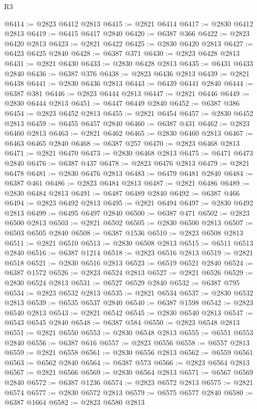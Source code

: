 \begin{lexlean}{R3}
\begin{coremodule}
@6414 := @2823 @6412 @2813
@6415 := @2821 @6414
@6417 := @2830 @6412 @2813
@6419 := @6415 @6417 @2840
@6420 := @6387 @366
@6422 := @2823 @6420 @2813
@6423 := @2821 @6422
@6425 := @2830 @6420 @2813
@6427 := @6423 @6425 @2840
@6428 := @6387 @371
@6430 := @2823 @6428 @2813
@6431 := @2821 @6430
@6433 := @2830 @6428 @2813
@6435 := @6431 @6433 @2840
@6436 := @6387 @376
@6438 := @2823 @6436 @2813
@6439 := @2821 @6438
@6441 := @2830 @6436 @2813
@6443 := @6439 @6441 @2840
@6444 := @6387 @381
@6446 := @2823 @6444 @2813
@6447 := @2821 @6446
@6449 := @2830 @6444 @2813
@6451 := @6447 @6449 @2840
@6452 := @6387 @386
@6454 := @2823 @6452 @2813
@6455 := @2821 @6454
@6457 := @2830 @6452 @2813
@6459 := @6455 @6457 @2840
@6460 := @6387 @431
@6462 := @2823 @6460 @2813
@6463 := @2821 @6462
@6465 := @2830 @6460 @2813
@6467 := @6463 @6465 @2840
@6468 := @6387 @257
@6470 := @2823 @6468 @2813
@6471 := @2821 @6470
@6473 := @2830 @6468 @2813
@6475 := @6471 @6473 @2840
@6476 := @6387 @437
@6478 := @2823 @6476 @2813
@6479 := @2821 @6478
@6481 := @2830 @6476 @2813
@6483 := @6479 @6481 @2840
@6484 := @6387 @461
@6486 := @2823 @6484 @2813
@6487 := @2821 @6486
@6489 := @2830 @6484 @2813
@6491 := @6487 @6489 @2840
@6492 := @6387 @466
@6494 := @2823 @6492 @2813
@6495 := @2821 @6494
@6497 := @2830 @6492 @2813
@6499 := @6495 @6497 @2840
@6500 := @6387 @471
@6502 := @2823 @6500 @2813
@6503 := @2821 @6502
@6505 := @2830 @6500 @2813
@6507 := @6503 @6505 @2840
@6508 := @6387 @1536
@6510 := @2823 @6508 @2813
@6511 := @2821 @6510
@6513 := @2830 @6508 @2813
@6515 := @6511 @6513 @2840
@6516 := @6387 @1214
@6518 := @2823 @6516 @2813
@6519 := @2821 @6518
@6521 := @2830 @6516 @2813
@6523 := @6519 @6521 @2840
@6524 := @6387 @1572
@6526 := @2823 @6524 @2813
@6527 := @2821 @6526
@6529 := @2830 @6524 @2813
@6531 := @6527 @6529 @2840
@6532 := @6387 @795
@6534 := @2823 @6532 @2813
@6535 := @2821 @6534
@6537 := @2830 @6532 @2813
@6539 := @6535 @6537 @2840
@6540 := @6387 @1598
@6542 := @2823 @6540 @2813
@6543 := @2821 @6542
@6545 := @2830 @6540 @2813
@6547 := @6543 @6545 @2840
@6548 := @6387 @584
@6550 := @2823 @6548 @2813
@6551 := @2821 @6550
@6553 := @2830 @6548 @2813
@6555 := @6551 @6553 @2840
@6556 := @6387 @616
@6557 := @2823 @6556
@6558 := @6557 @2813
@6559 := @2821 @6558
@6561 := @2830 @6556 @2813
@6562 := @6559 @6561
@6563 := @6562 @2840
@6564 := @6387 @573
@6566 := @2823 @6564 @2813
@6567 := @2821 @6566
@6569 := @2830 @6564 @2813
@6571 := @6567 @6569 @2840
@6572 := @6387 @1236
@6574 := @2823 @6572 @2813
@6575 := @2821 @6574
@6577 := @2830 @6572 @2813
@6579 := @6575 @6577 @2840
@6580 := @6387 @1664
@6582 := @2823 @6580 @2813

\end{coremodule}
\end{lexlean}
